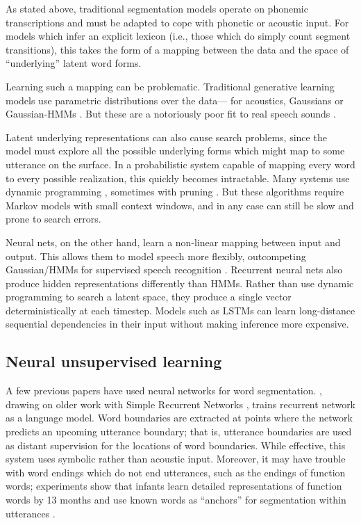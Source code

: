 \documentclass[11pt,letterpaper]{article}
\begin{document}
As stated above, traditional segmentation models operate on phonemic
transcriptions and must be adapted to cope with phonetic or acoustic
input. For models which infer an explicit lexicon (i.e., those which
do simply count segment transitions), this takes the form of a mapping
between the data and the space of ``underlying'' latent word
forms.

Learning such a mapping can be problematic. Traditional generative
learning models use parametric distributions over the data--- for
acoustics, Gaussians \cite{Vallabha07,Feldman09} or Gaussian-HMMs
\cite{Lee12,Lee15}. But these are a notoriously poor fit to real speech sounds
\cite{Glass?}.

Latent underlying representations can also cause search problems,
since the model must explore all the possible underlying forms which
might map to some utterance on the surface. In a probabilistic system
capable of mapping every word to every possible realization, this
quickly becomes intractable. Many systems use dynamic programming
\cite{Mochihashi09,Neubig10}, sometimes with pruning
\cite{vanGael08}. But these algorithms require Markov models with
small context windows, and in any case can still be slow and prone to
search errors.

Neural nets, on the other hand, learn a non-linear mapping between
input and output. This allows them to model speech more flexibly,
outcompeting Gaussian/HMMs for supervised speech recognition
\cite{Graves13,Hinton12}. Recurrent neural nets also produce hidden
representations differently than HMMs. Rather than use dynamic
programming to search a latent space, they produce a single vector
deterministically at each timestep. Models such as LSTMs
\cite{Hochreiter97} can learn long-distance sequential dependencies in
their input without making inference more expensive.

\subsection{Neural unsupervised learning}
\label{sub-neural}

A few previous papers have used neural networks for word
segmentation. , drawing on older work with
Simple Recurrent Networks \cite{Elman90}, trains recurrent network as
a language model. Word boundaries are extracted at points where the
network predicts an upcoming utterance boundary; that is, utterance
boundaries are used as distant supervision for the locations of word
boundaries. While effective, this system uses symbolic rather than
acoustic input. Moreover, it may have trouble with word endings which
do not end utterances, such as the endings of function words;
experiments show that infants learn detailed representations of
function words by 13 months \cite{Shi06} and use known words as
``anchors'' for segmentation within utterances \cite{Bortfeld05}.
\end{document}
